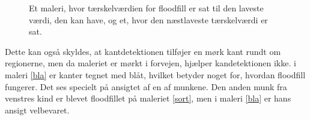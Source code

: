 \begin{figure}[!h]
    \centering
     \caption{Et maleri, hvor tærskelværdien for floodfill er sat til
	 den laveste værdi, den kan have, og et, hvor den næstlaveste tærskelværdi er sat.}
     \label{ff_munke}
\end{figure}

Dette kan også skyldes, at kantdetektionen tilføjer en mørk kant rundt
om regionerne, men da maleriet er mørkt i forvejen, hjælper
kandetektionen ikke. i maleri \ref{bla} er kanter tegnet med blåt,
hvilket betyder noget for, hvordan floodfill fungerer.
Det ses specielt på ansigtet af en af munkene. Den anden munk fra
venstres kind er blevet floodfillet på maleriet \ref{sort}, men i maleri
\ref{bla} er hans ansigt velbevaret.

